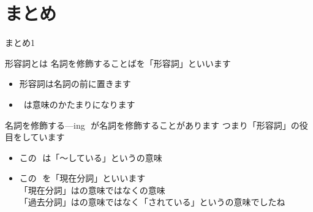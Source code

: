 \documentclass[aspectratio=169,xcolor={dvipsnames,table}]{beamer}
\begin{document}
\section{まとめ}
\begin{frame}[plain]{まとめ1}

 \begin{block}{形容詞とは}\small
名詞を修飾することばを「形容詞」といいます
\begin{itemize}[square]\small
\setlength{\itemsep}{5pt}
 \item 形容詞は名詞の前に置きます
 \item {}\,\,\,は意味のかたまりになります
 \end{itemize}
     \end{block}

\begin{block}{名詞を修飾する---ing}\small
{}\,\,が名詞を修飾することがあります%
\hfill{\scriptsize つまり「形容詞」の役目をしています}

\begin{itemize}[square]\small
\setlength{\itemsep}{5pt}
 \item この\,\,\,\,は「～している」というの意味
 \item この\,\,\,\,を「現在分詞」といいます\\
{\scriptsize \textdbend\textdbend 「現在分詞」はの意味ではなくの意味}\\
\hfill{\scriptsize 「過去分詞」はの意味ではなく「されている」というの意味でしたね}
 \end{itemize}
     \end{block}

\end{frame}
\end{document}
